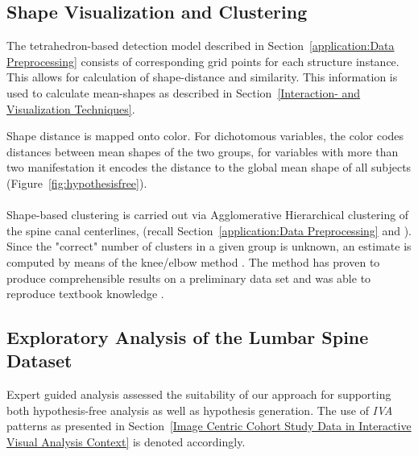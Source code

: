 \documentclass[journal]{style/vgtc} 			          %
\begin{document}
\subsection{Shape Visualization and Clustering}
%
The tetrahedron-based detection model described in Section~\ref{application:Data Preprocessing} consists of corresponding grid points for each structure instance.
%
This allows for calculation of shape-distance and similarity.
%
This information is used to calculate mean-shapes as described in Section~\ref{Interaction- and Visualization Techniques}.

Shape distance is mapped onto color.
%
For dichotomous variables, the color codes distances between mean shapes of the two groups, for variables with more than two manifestation it encodes the distance to the global mean shape of all subjects (Figure~\ref{fig:hypothesisfree}).
\\\\
Shape-based clustering is carried out via Agglomerative Hierarchical clustering of the spine canal centerlines, (recall Section~\ref{application:Data Preprocessing} and \cite{Klemm2013VMV}).
%
Since the "correct" number of clusters in a given group is unknown, an estimate is computed by means of the knee/elbow method \cite{Salvador2004}.
%
%
The method has proven to produce comprehensible results on a preliminary data set and was able to reproduce textbook knowledge \cite{Klemm2013VMV}.

\subsection{Exploratory Analysis of the Lumbar Spine Dataset}
%
Expert guided analysis assessed the suitability of our approach for supporting both hypothesis-free analysis as well as hypothesis generation. 
%
The use of \emph{IVA} patterns as presented in Section~\ref{Image Centric Cohort Study Data in Interactive Visual Analysis Context} is denoted accordingly.
%
\end{document}
